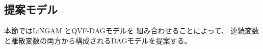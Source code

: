 
\subsection{提案モデル}

本節ではLiNGAM \cite{Shimizu2006-yu}とQVF-DAGモデル\cite{Park2017-hw}を
組み合わせることによって、
連続変数と離散変数の両方から構成されるDAGモデルを提案する。
